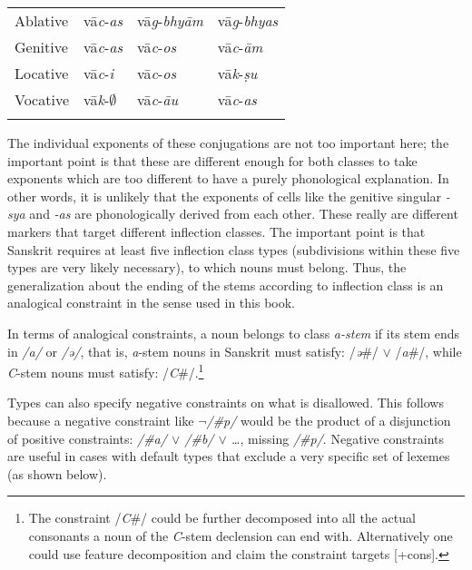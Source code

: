 \begin{table}
\begin{tabular}{llll}
      Ablative     & vā\textit{c}-\textit{as}          & vā\textit{g}-\textit{bhyām} & vā\textit{g}-\textit{bhyas} \\
      Genitive     & vā\textit{c}-\textit{as}          & vā\textit{c}-\textit{os}    & vā\textit{c}-\textit{ām}    \\
      Locative     & vā\textit{c}-\textit{i }          & vā\textit{c}-\textit{os}    & vā\textit{k}-\textit{ṣu}    \\
      Vocative     & vā\textit{k}-$\emptyset$ & vā\textit{c}-\textit{āu}    & vā\textit{c}-\textit{as}    \\
      \lspbottomrule
    \end{tabular}
\end{table}

The individual exponents of these conjugations are not too important here; the important point is that these are different enough for both classes to take exponents which are too different to have a purely phonological explanation. In other words, it is unlikely that the exponents of cells like the genitive singular \textit{-sya} and \textit{-as} are phonologically derived from each other. These really are different markers that target different inflection classes. The important point is that Sanskrit requires at least five inflection class types (subdivisions within these five types are very likely necessary), to which nouns must belong. Thus, the generalization about the ending of the stems according to inflection class is an analogical constraint in the sense used in this book.

In terms of analogical constraints, a noun belongs to class \textit{a-stem} if its stem ends in \textit{/a/} or \textit{/ə/}, that is, \textit{a}-stem nouns in Sanskrit must satisfy: /\textit{ə}\#/ $\lor$ /\textit{a}\#/, while \textit{C}-stem nouns must satisfy: /\textit{C}\#/.\footnote{The constraint /\textit{C}\#/ could be further decomposed into all the actual consonants a noun of the \textit{C}-stem declension can end with. Alternatively one could use feature decomposition and claim the constraint targets [+cons].}

Types can also specify negative constraints on what is disallowed. This follows because a negative constraint like \textit{$\lnot$/\#p/} would be the product of a disjunction of positive constraints: \textit{/\#a/ $\lor$ /\#b/ $\lor$ \dots}, missing \textit{/\#p/}. Negative constraints are useful in cases with default types that exclude a very specific set of lexemes (as shown below). 

